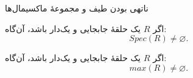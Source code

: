 \begin{frame}[t]{ناتهی بودن طیف و مجموعهٔ ماکسیمال‌ها}
    \begin{corollary}
        اگر $R$ یک حلقهٔ جابجایی و یک‌دار باشد، آن‌گاه:
        \[
            Spec(R) \ne \varnothing.
        \]
    \end{corollary}

    \begin{corollary}
        اگر $R$ یک حلقهٔ جابجایی و یک‌دار باشد، آن‌گاه:
        \[
            max(R) \ne \varnothing.
        \]
    \end{corollary}


\end{frame}
